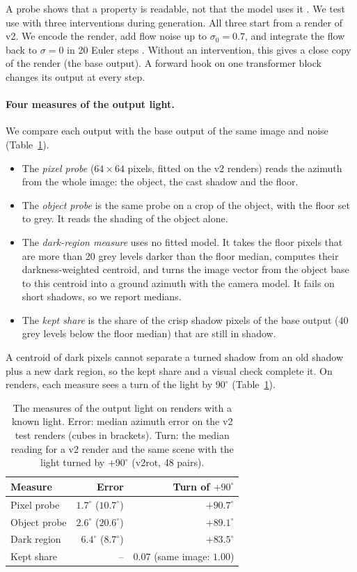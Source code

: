 \documentclass[10pt]{article}
\newcommand{\degr}{^\circ}
\begin{document}
A probe shows that a property is readable, not that the model uses it \citep{elazar2021amnesic,belinkov2022probing}.
We test use with three interventions during generation.
All three start from a render of v2.
We encode the render, add flow noise up to $\sigma_0=0.7$, and integrate the flow back to $\sigma=0$ in 20 Euler steps \citep{meng2022sdedit}.
Without an intervention, this gives a close copy of the render (the base output).
A forward hook on one transformer block changes its output at every step.

\paragraph{Four measures of the output light.}
We compare each output with the base output of the same image and noise (Table~\ref{tab:measures}).
\begin{itemize}
    \item The \emph{pixel probe} ($64\times64$ pixels, fitted on the v2 renders) reads the azimuth from the whole image: the object, the cast shadow and the floor.
    \item The \emph{object probe} is the same probe on a crop of the object, with the floor set to grey. It reads the shading of the object alone.
    \item The \emph{dark-region measure} uses no fitted model. It takes the floor pixels that are more than 20 grey levels darker than the floor median, computes their darkness-weighted centroid, and turns the image vector from the object base to this centroid into a ground azimuth with the camera model. It fails on short shadows, so we report medians.
    \item The \emph{kept share} is the share of the crisp shadow pixels of the base output (40 grey levels below the floor median) that are still in shadow.
\end{itemize}
A centroid of dark pixels cannot separate a turned shadow from an old shadow plus a new dark region, so the kept share and a visual check complete it.
On renders, each measure sees a turn of the light by $90\degr$ (Table~\ref{tab:measures}).

\begin{table}[t]
\centering
\caption{The measures of the output light on renders with a known light. Error: median azimuth error on the v2 test renders (cubes in brackets). Turn: the median reading for a v2 render and the same scene with the light turned by $+90\degr$ (v2rot, 48 pairs).}
\label{tab:measures}
\begin{tabular}{lrr}
\toprule
Measure & Error & Turn of $+90\degr$ \\
\midrule
Pixel probe & $1.7\degr$ ($10.7\degr$) & $+90.7\degr$ \\
Object probe & $2.6\degr$ ($20.6\degr$) & $+89.1\degr$ \\
Dark region & $6.4\degr$ ($8.7\degr$) & $+83.5\degr$ \\
Kept share & -- & $0.07$ (same image: $1.00$) \\
\bottomrule
\end{tabular}
\end{table}
\end{document}
